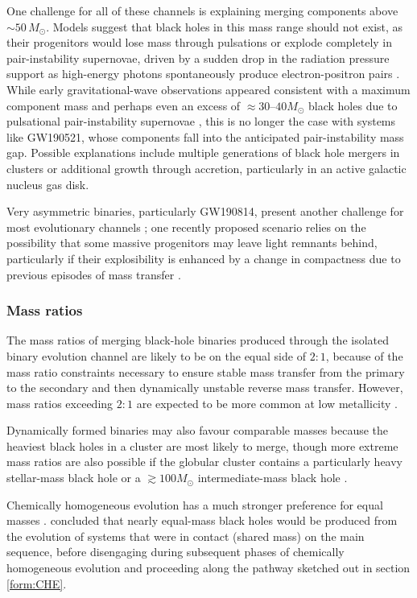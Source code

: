 \documentclass[review]{elsarticle}
\begin{document}
One challenge for all of these channels is explaining merging components above $\sim 50\, M_\odot$.  Models suggest that black holes in this mass range should not exist, as their progenitors would lose mass through pulsations or explode completely in pair-instability supernovae, driven by a sudden drop in the radiation pressure support as high-energy photons spontaneously produce electron-positron pairs  \citep[e.g.,][]{Woosley:2017,Farmer:2019}.  While early gravitational-wave observations appeared consistent with a maximum component mass and perhaps even an excess of $\approx 30$--$40 M_\odot$ black holes due to pulsational pair-instability supernovae \citep[e.g.,][]{Stevenson:2019}, this is no longer the case with systems like GW190521, whose components fall into the anticipated pair-instability mass gap.  Possible explanations \citep{GW190521:astro} include multiple generations of black hole mergers in clusters \citep{Rodriguez:2019} or additional growth through accretion, particularly in an active galactic nucleus gas disk.

Very asymmetric binaries, particularly GW190814, present another challenge for most evolutionary channels \citep{Zevin:2020,Mandel:2020}; one recently proposed scenario relies on the possibility that some massive progenitors may leave light remnants behind, particularly if their explosibility is enhanced by a change in compactness due to previous episodes of mass transfer \citep{Antoniadis:2021}.  

\subsubsection{Mass ratios}
The mass ratios of merging black-hole binaries produced through the isolated binary evolution channel are likely to be on the equal side of $2:1$, because of the mass ratio constraints necessary to ensure stable mass transfer from the primary to the secondary and then dynamically unstable reverse mass transfer. However, mass ratios exceeding $2:1$ are expected to be more common at low metallicity \citep{Dominik:2012,Stevenson:2017}.

Dynamically formed binaries may also favour comparable masses because the heaviest black holes in a cluster are most likely to merge, though more extreme mass ratios are also possible if the globular cluster contains a particularly heavy stellar-mass black hole or a $\gtrsim 100 M_\odot$ intermediate-mass black hole \citep{Mandel:2008,Belczynski:2014VMS}. 

Chemically homogeneous evolution has a much stronger preference for equal masses \citep{MandeldeMink:2016}.  \citet{Marchant:2016,Riley:2020} concluded that nearly equal-mass black holes would be produced from the evolution of systems that were in contact (shared mass) on the main sequence, before disengaging during subsequent phases of chemically homogeneous evolution and proceeding along the pathway sketched out in section \ref{form:CHE}. 
\end{document}
